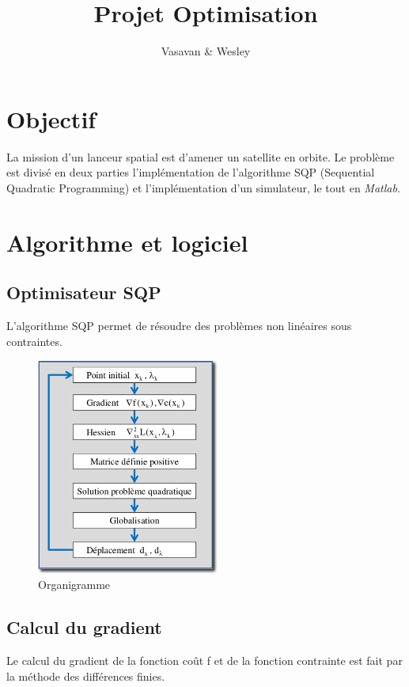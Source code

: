 \documentclass[a4paper,20pt]{article}
\title{Projet Optimisation}
\author{Vasavan \& Wesley}
\begin{document}
\maketitle
\newpage
\protect\hypertarget{table}{}
\renewcommand{\contentsname}{Sommaire}
\tableofcontents
\newpage
\newpage

\section{Objectif}
La mission d'un lanceur spatial est d'amener un satellite en orbite. Le
 probl\`eme est divis\'e en deux parties l'impl\'ementation de l'algorithme SQP
 (Sequential Quadratic Programming) et l'impl\'ementation d'un simulateur, le
 tout en \textit{Matlab}.
\newpage

\section{Algorithme et logiciel}
\subsection{Optimisateur SQP}
L'algorithme SQP permet de r\'esoudre des probl\`emes non lin\'eaires sous
 contraintes.

\begin{figure}[h!]
\centering
\includegraphics[width=6cm]{capture.png}
\caption{Organigramme}
\label{fig:1}
\end{figure}

\subsection{Calcul du gradient}
Le calcul du gradient de la fonction co\^ut f et de
la fonction contrainte est fait par la méthode des diff\'erences finies.
\end{document}
